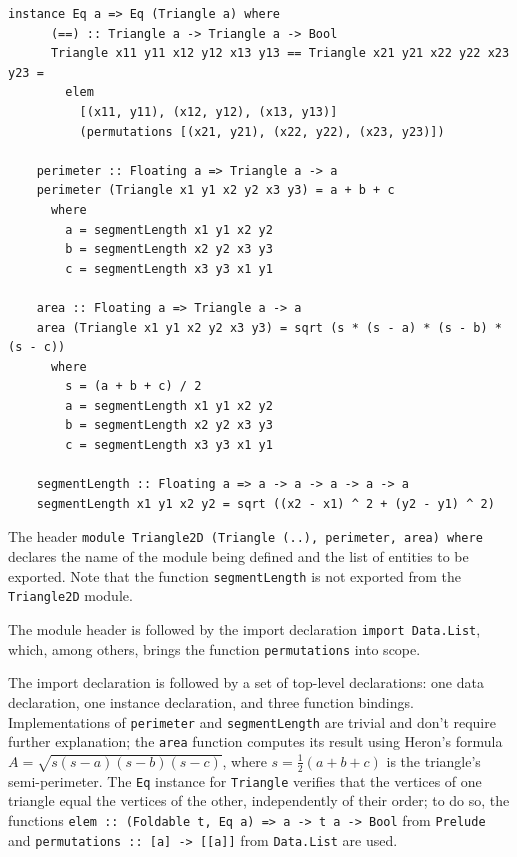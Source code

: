 \documentclass[UdineBachThesis,american,11pt]{PhdThesis}
\begin{document}
  \begin{Verbatim}[gobble=4,fontsize=\small]
    instance Eq a => Eq (Triangle a) where
      (==) :: Triangle a -> Triangle a -> Bool
      Triangle x11 y11 x12 y12 x13 y13 == Triangle x21 y21 x22 y22 x23 y23 =
        elem
          [(x11, y11), (x12, y12), (x13, y13)]
          (permutations [(x21, y21), (x22, y22), (x23, y23)])

    perimeter :: Floating a => Triangle a -> a
    perimeter (Triangle x1 y1 x2 y2 x3 y3) = a + b + c
      where
        a = segmentLength x1 y1 x2 y2
        b = segmentLength x2 y2 x3 y3
        c = segmentLength x3 y3 x1 y1

    area :: Floating a => Triangle a -> a
    area (Triangle x1 y1 x2 y2 x3 y3) = sqrt (s * (s - a) * (s - b) * (s - c))
      where
        s = (a + b + c) / 2
        a = segmentLength x1 y1 x2 y2
        b = segmentLength x2 y2 x3 y3
        c = segmentLength x3 y3 x1 y1

    segmentLength :: Floating a => a -> a -> a -> a -> a
    segmentLength x1 y1 x2 y2 = sqrt ((x2 - x1) ^ 2 + (y2 - y1) ^ 2)
  \end{Verbatim}

  The header
  \mbox{\texttt{module Triangle2D (Triangle (..), perimeter, area) where}}
  declares the name of the module being defined and the list of entities to be
  exported. Note that the function \mbox{\texttt{segmentLength}} is not exported
  from the \mbox{\texttt{Triangle2D}} module.

  The module header is followed by the import declaration
  \mbox{\texttt{import Data.List}}, which, among others, brings the function
  \mbox{\texttt{permutations}} into scope.

  The import declaration is followed by a set of top-level declarations: one
  data declaration, one instance declaration, and three function bindings.
  Implementations of \mbox{\texttt{perimeter}} and \mbox{\texttt{segmentLength}}
  are trivial and don't require further explanation; the \mbox{\texttt{area}}
  function computes its result using Heron's formula
  \mbox{$A = \sqrt{s \left(s - a\right) \left(s - b\right) \left(s - c\right)}$},
  where \mbox{$s = \frac{1}{2} \left(a + b + c\right)$} is the triangle's
  semi-perimeter. The \mbox{\texttt{Eq}} instance for \mbox{\texttt{Triangle}}
  verifies that the vertices of one triangle equal the vertices of the other,
  independently of their order; to do so, the functions
  \mbox{\texttt{elem :: (Foldable t, Eq a) => a -> t a -> Bool}} from
  \mbox{\texttt{Prelude}} and \mbox{\texttt{permutations :: [a] -> [[a]]}} from
  \mbox{\texttt{Data.List}} are used.
\end{document}
